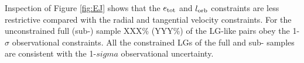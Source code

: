 \documentclass{emulateapj}
\newcommand{\kms}{\,km~s$^{-1}$}
\begin{document}
Inspection of Figure \ref{fig:EJ}  shows that the $e_{\rm tot}$  and $l_{\rm orb}$ constraints are less restrictive compared with the radial and tangential velocity constraints. For the unconstrained full (sub-) sample XXX\% (YYY\%)  of the LG-like pairs obey the 1-$\sigma$ observational constraints. All the constrained LGs of the full and sub- samples are consistent with the 1-$sigma$ observational uncertainty.
\end{document}

